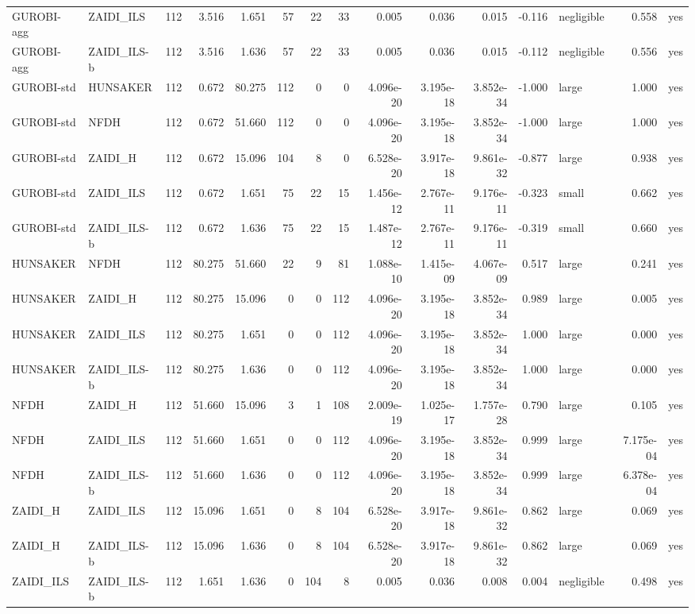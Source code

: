 \begin{table}[htbp]
\begin{tabular}{llrrrrrrrrrrlrr}
GUROBI-agg & ZAIDI\_ILS & 112 & 3.516 & 1.651 & 57 & 22 & 33 & 0.005 & 0.036 & 0.015 & -0.116 & negligible & 0.558 & yes \\
GUROBI-agg & ZAIDI\_ILS-b & 112 & 3.516 & 1.636 & 57 & 22 & 33 & 0.005 & 0.036 & 0.015 & -0.112 & negligible & 0.556 & yes \\
GUROBI-std & HUNSAKER & 112 & 0.672 & 80.275 & 112 & 0 & 0 & 4.096e-20 & 3.195e-18 & 3.852e-34 & -1.000 & large & 1.000 & yes \\
GUROBI-std & NFDH & 112 & 0.672 & 51.660 & 112 & 0 & 0 & 4.096e-20 & 3.195e-18 & 3.852e-34 & -1.000 & large & 1.000 & yes \\
GUROBI-std & ZAIDI\_H & 112 & 0.672 & 15.096 & 104 & 8 & 0 & 6.528e-20 & 3.917e-18 & 9.861e-32 & -0.877 & large & 0.938 & yes \\
GUROBI-std & ZAIDI\_ILS & 112 & 0.672 & 1.651 & 75 & 22 & 15 & 1.456e-12 & 2.767e-11 & 9.176e-11 & -0.323 & small & 0.662 & yes \\
GUROBI-std & ZAIDI\_ILS-b & 112 & 0.672 & 1.636 & 75 & 22 & 15 & 1.487e-12 & 2.767e-11 & 9.176e-11 & -0.319 & small & 0.660 & yes \\
HUNSAKER & NFDH & 112 & 80.275 & 51.660 & 22 & 9 & 81 & 1.088e-10 & 1.415e-09 & 4.067e-09 & 0.517 & large & 0.241 & yes \\
HUNSAKER & ZAIDI\_H & 112 & 80.275 & 15.096 & 0 & 0 & 112 & 4.096e-20 & 3.195e-18 & 3.852e-34 & 0.989 & large & 0.005 & yes \\
HUNSAKER & ZAIDI\_ILS & 112 & 80.275 & 1.651 & 0 & 0 & 112 & 4.096e-20 & 3.195e-18 & 3.852e-34 & 1.000 & large & 0.000 & yes \\
HUNSAKER & ZAIDI\_ILS-b & 112 & 80.275 & 1.636 & 0 & 0 & 112 & 4.096e-20 & 3.195e-18 & 3.852e-34 & 1.000 & large & 0.000 & yes \\
NFDH & ZAIDI\_H & 112 & 51.660 & 15.096 & 3 & 1 & 108 & 2.009e-19 & 1.025e-17 & 1.757e-28 & 0.790 & large & 0.105 & yes \\
NFDH & ZAIDI\_ILS & 112 & 51.660 & 1.651 & 0 & 0 & 112 & 4.096e-20 & 3.195e-18 & 3.852e-34 & 0.999 & large & 7.175e-04 & yes \\
NFDH & ZAIDI\_ILS-b & 112 & 51.660 & 1.636 & 0 & 0 & 112 & 4.096e-20 & 3.195e-18 & 3.852e-34 & 0.999 & large & 6.378e-04 & yes \\
ZAIDI\_H & ZAIDI\_ILS & 112 & 15.096 & 1.651 & 0 & 8 & 104 & 6.528e-20 & 3.917e-18 & 9.861e-32 & 0.862 & large & 0.069 & yes \\
ZAIDI\_H & ZAIDI\_ILS-b & 112 & 15.096 & 1.636 & 0 & 8 & 104 & 6.528e-20 & 3.917e-18 & 9.861e-32 & 0.862 & large & 0.069 & yes \\
ZAIDI\_ILS & ZAIDI\_ILS-b & 112 & 1.651 & 1.636 & 0 & 104 & 8 & 0.005 & 0.036 & 0.008 & 0.004 & negligible & 0.498 & yes \\
\bottomrule
\end{tabular}
\end{table}
